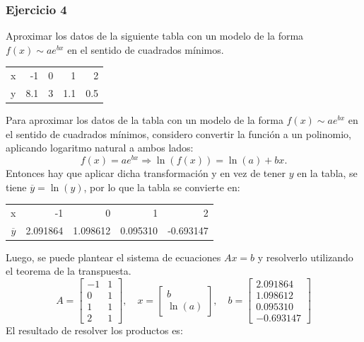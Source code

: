 \documentclass{article}
\begin{document}
\subsubsection{Ejercicio 4}
Aproximar los datos de la siguiente tabla con un modelo de la forma $f(x) \sim ae^{bx}$ en el sentido de cuadrados mínimos.
\begin{center}
\begin{tabular}{||r||r|r|r|r||}
\hline
x & -1 & 0 & 1 & 2\\
y & 8.1 & 3 & 1.1 & 0.5\\
\hline
\end{tabular}
\end{center}
Para aproximar los datos de la tabla con un modelo de la forma \( f(x) \sim ae^{bx} \) en el sentido de cuadrados mínimos, considero convertir la función a un polinomio, aplicando logaritmo natural a ambos lados:
\[
f(x) = ae^{bx} \Rightarrow \ln(f(x)) = \ln(a) + bx.
\]
Entonces hay que aplicar dicha transformación y en vez de tener $y$ en la tabla, se tiene $\overline{y} = \ln(y)$, por lo que la tabla se convierte en:
\begin{center}
\begin{tabular}{||r||r|r|r|r||}
\hline
x & -1 & 0 & 1 & 2\\
$\overline{y}$ & 2.091864 & 1.098612 & 0.095310 & -0.693147\\
\hline
\end{tabular}
\end{center}
Luego, se puede plantear el sistema de ecuaciones $Ax = b$ y resolverlo utilizando el teorema de la transpuesta.
\begin{equation}
    A = \begin{bmatrix}
        -1 & 1 \\
        0 & 1 \\
        1 & 1 \\
        2 & 1
    \end{bmatrix}, \quad x = \begin{bmatrix}
        b \\
        \ln(a)
    \end{bmatrix}, \quad b = \begin{bmatrix}
        2.091864 \\
        1.098612 \\
        0.095310 \\
        -0.693147
    \end{bmatrix}
\end{equation}
El resultado de resolver los productos es:
\end{document}
